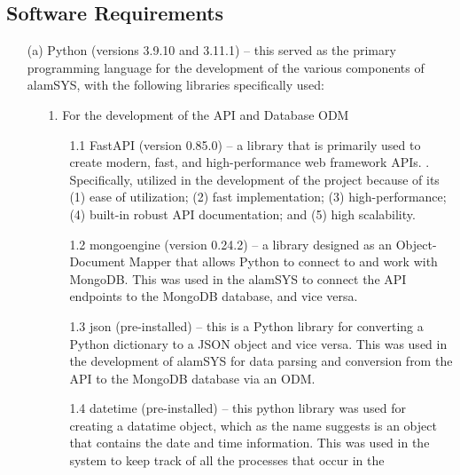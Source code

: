 \subsection{Software Requirements}
\label{sec:software_requirements}
\begin{itemize}
    \item[(a)] Python (versions 3.9.10 and 3.11.1) – this served as the primary 
    programming language for the development of the various 
    components of alamSYS, with the following libraries specifically 
    used:
        \begin{itemize}
            \item[1.] For the development of the API and Database ODM
                \begin{itemize}
                    \item[1.1] FastAPI (version 0.85.0) – a library that is 
                    primarily used to create modern, fast, and 
                    high-performance web framework APIs. 
                    \cite{Tiangolo}.
                    Specifically, utilized in the development of the project 
                    because of its 
                    (1) ease of utilization; 
                    (2) fast implementation; 
                    (3) high-performance; 
                    (4) built-in robust API documentation; and 
                    (5) high scalability.
                    \item[1.2] mongoengine (version 0.24.2) – a library 
                    designed as an Object-Document Mapper that allows Python to 
                    connect to and work with MongoDB.
                    \cite{MongoEngine}
                    This was used in the alamSYS to connect the API endpoints to the 
                    MongoDB database, and vice versa.
                    \item[1.3] json (pre-installed) – this is a Python library for 
                    converting a Python dictionary to a JSON object and vice versa. 
                    This was used in the development of alamSYS for data 
                    parsing and conversion from the API to the MongoDB database 
                    via an ODM.
                    \item[1.4] datetime (pre-installed) – this python library was
                    used for creating a datatime object, which as the name 
                    suggests is an object that contains the date 
                    and time information. This was used in the system to 
                    keep track of all the processes that occur in the 

\end{itemize}
\end{itemize}
\end{itemize}
